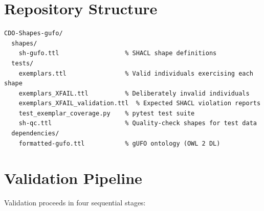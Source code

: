 \documentclass[12pt,a4paper]{article}
\begin{document}
\section{Repository Structure}

\begin{lstlisting}[style=sparqlstyle]
CDO-Shapes-gufo/
  shapes/
    sh-gufo.ttl                  % SHACL shape definitions
  tests/
    exemplars.ttl                % Valid individuals exercising each shape
    exemplars_XFAIL.ttl          % Deliberately invalid individuals
    exemplars_XFAIL_validation.ttl  % Expected SHACL violation reports
    test_exemplar_coverage.py    % pytest test suite
    sh-qc.ttl                    % Quality-check shapes for test data
  dependencies/
    formatted-gufo.ttl           % gUFO ontology (OWL 2 DL)
\end{lstlisting}

\section{Validation Pipeline}

Validation proceeds in four sequential stages:
\end{document}
